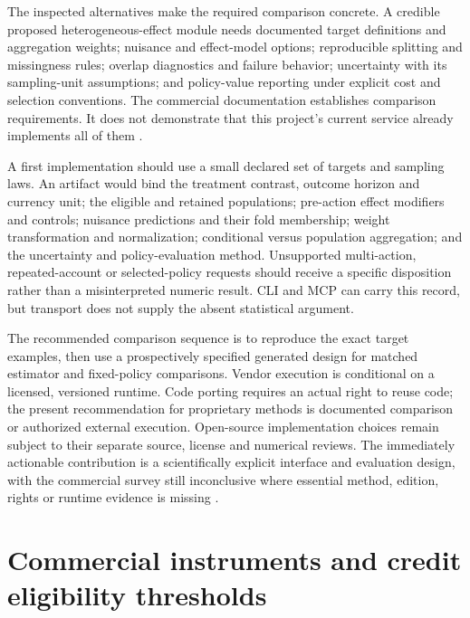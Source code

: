 The inspected alternatives make the required comparison concrete. A
credible proposed heterogeneous-effect module needs documented target
definitions and aggregation weights; nuisance and effect-model options;
reproducible splitting and missingness rules; overlap diagnostics and
failure behavior; uncertainty with its sampling-unit assumptions; and
policy-value reporting under explicit cost and selection conventions.
The commercial documentation establishes comparison requirements. It does
not demonstrate that this project's current service already implements
all of them \cite{exec13_ch_stata,exec13_ch_jmp_causal,exec13_ch_scope}.

A first implementation should use a small declared set of targets and
sampling laws. An artifact would bind the treatment contrast, outcome
horizon and currency unit; the eligible and retained populations;
pre-action effect modifiers and controls; nuisance predictions and their
fold membership; weight transformation and normalization; conditional
versus population aggregation; and the uncertainty and policy-evaluation
method. Unsupported multi-action, repeated-account or selected-policy
requests should receive a specific disposition rather than a
misinterpreted numeric result. CLI and MCP can carry this record, but
transport does not supply the absent statistical argument.

The recommended comparison sequence is to reproduce the exact target
examples, then use a prospectively specified generated design for matched
estimator and fixed-policy comparisons. Vendor execution is conditional
on a licensed, versioned runtime. Code porting requires an actual right
to reuse code; the present recommendation for proprietary methods is
documented comparison or authorized external execution. Open-source
implementation choices remain subject to their separate source, license
and numerical reviews. The immediately actionable contribution is a
scientifically explicit interface and evaluation design, with the
commercial survey still inconclusive where essential method, edition,
rights or runtime evidence is missing \cite{exec13_ch_scope}.
\label{exec13:commercial-heterogeneity-end}


\section{Commercial instruments and credit eligibility thresholds}
\label{exec13:commercial-iv-rd}

